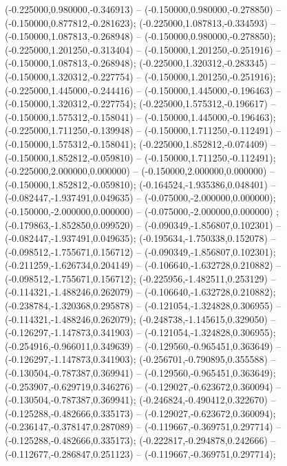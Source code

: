  (-0.225000,0.980000,-0.346913) -- (-0.150000,0.980000,-0.278850) -- (-0.150000,0.877812,-0.281623);
 (-0.225000,1.087813,-0.334593) -- (-0.150000,1.087813,-0.268948) -- (-0.150000,0.980000,-0.278850);
 (-0.225000,1.201250,-0.313404) -- (-0.150000,1.201250,-0.251916) -- (-0.150000,1.087813,-0.268948);
 (-0.225000,1.320312,-0.283345) -- (-0.150000,1.320312,-0.227754) -- (-0.150000,1.201250,-0.251916);
 (-0.225000,1.445000,-0.244416) -- (-0.150000,1.445000,-0.196463) -- (-0.150000,1.320312,-0.227754);
 (-0.225000,1.575312,-0.196617) -- (-0.150000,1.575312,-0.158041) -- (-0.150000,1.445000,-0.196463);
 (-0.225000,1.711250,-0.139948) -- (-0.150000,1.711250,-0.112491) -- (-0.150000,1.575312,-0.158041);
 (-0.225000,1.852812,-0.074409) -- (-0.150000,1.852812,-0.059810) -- (-0.150000,1.711250,-0.112491);
 (-0.225000,2.000000,0.000000) -- (-0.150000,2.000000,0.000000) -- (-0.150000,1.852812,-0.059810);
 (-0.164524,-1.935386,0.048401) -- (-0.082447,-1.937491,0.049635) -- (-0.075000,-2.000000,0.000000);
 (-0.150000,-2.000000,0.000000) -- (-0.075000,-2.000000,0.000000) ;
 (-0.179863,-1.852850,0.099520) -- (-0.090349,-1.856807,0.102301) -- (-0.082447,-1.937491,0.049635);
 (-0.195634,-1.750338,0.152078) -- (-0.098512,-1.755671,0.156712) -- (-0.090349,-1.856807,0.102301);
 (-0.211259,-1.626734,0.204149) -- (-0.106640,-1.632728,0.210882) -- (-0.098512,-1.755671,0.156712);
 (-0.225956,-1.482511,0.253129) -- (-0.114321,-1.488246,0.262079) -- (-0.106640,-1.632728,0.210882);
 (-0.238784,-1.320368,0.295878) -- (-0.121054,-1.324828,0.306955) -- (-0.114321,-1.488246,0.262079);
 (-0.248738,-1.145615,0.329050) -- (-0.126297,-1.147873,0.341903) -- (-0.121054,-1.324828,0.306955);
 (-0.254916,-0.966011,0.349639) -- (-0.129560,-0.965451,0.363649) -- (-0.126297,-1.147873,0.341903);
 (-0.256701,-0.790895,0.355588) -- (-0.130504,-0.787387,0.369941) -- (-0.129560,-0.965451,0.363649);
 (-0.253907,-0.629719,0.346276) -- (-0.129027,-0.623672,0.360094) -- (-0.130504,-0.787387,0.369941);
 (-0.246824,-0.490412,0.322670) -- (-0.125288,-0.482666,0.335173) -- (-0.129027,-0.623672,0.360094);
 (-0.236147,-0.378147,0.287089) -- (-0.119667,-0.369751,0.297714) -- (-0.125288,-0.482666,0.335173);
 (-0.222817,-0.294878,0.242666) -- (-0.112677,-0.286847,0.251123) -- (-0.119667,-0.369751,0.297714);
